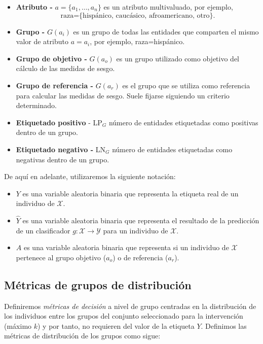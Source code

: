 \documentclass[oneside,openright,titlepage,numbers=noenddot,openany,headinclude,footinclude=true,
cleardoublepage=empty,abstractoff,BCOR=5mm,paper=a4,fontsize=12pt,main=spanish]{scrreprt}
\begin{document}
\begin{itemize}
    \item \textbf{Atributo -} $a = \{a_1,\dots,a_n\}$ es un atributo multivaluado, por ejemplo, $$\text{raza=\{hispánico, caucásico, afroamericano, otro\}}.$$
    \item \textbf{Grupo -} $G(a_i)$ es un grupo de todas las entidades que comparten el mismo valor de atributo $a=a_i$, por ejemplo, raza=hispánico.
    \item \textbf{Grupo de objetivo -} $G(a_o)$ es un grupo utilizado como objetivo del cálculo de las medidas de sesgo.
    \item \textbf{Grupo de referencia -} $G(a_r)$ es el grupo que se utiliza como referencia para calcular las medidas de sesgo. Suele fijarse siguiendo un criterio determinado.
    \item \textbf{Etiquetado positivo} - LP$_G$ número de entidades etiquetadas como positivas dentro de un grupo.
    \item \textbf{Etiquetado negativo -} LN$_G$ número de entidades etiquetadas como negativas dentro de un grupo.
\end{itemize}

\begin{notation}
De aquí en adelante, utilizaremos la siguiente notación:

\begin{itemize}
    \item $Y$ es una variable aleatoria binaria que representa la etiqueta real de un individuo de $\mathcal{X}.$
    \item $\hat{Y}$ es una variable aleatoria binaria que representa el resultado de la predicción de un clasificador $g\colon \mathcal{X} \to \mathcal{Y}$ para un individuo de $\mathcal{X}.$
    \item $A$ es una variable aleatoria binaria que representa si un individuo de $\mathcal{X}$ pertenece al grupo objetivo ($a_o$) o de referencia ($a_r$).
\end{itemize}
\end{notation}

\subsection*{Métricas de grupos de distribución}

Definiremos \textit{métricas de decisión} a nivel de grupo centradas en la distribución de los individuos entre los grupos del conjunto seleccionado para la intervención (máximo $k$) y por
tanto, no requieren del valor de la etiqueta $Y$. Definimos las métricas de distribución de los grupos como sigue:
\end{document}
